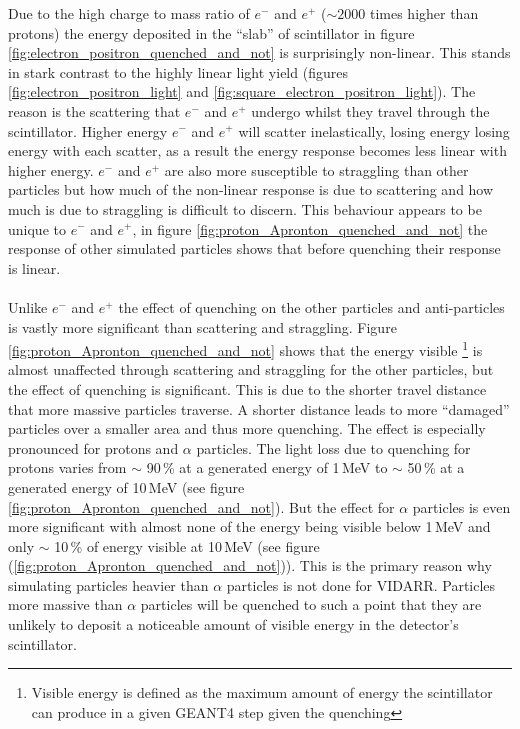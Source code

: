 Due to the high charge to mass ratio of $e^-$ and $e^+$ ($\sim 2000$ times higher than protons) the energy deposited in the ``slab'' of scintillator in figure \ref{fig:electron_positron_quenched_and_not} is surprisingly non-linear. This stands in stark contrast to the highly linear light yield (figures \ref{fig:electron_positron_light} and \ref{fig:square_electron_positron_light}). The reason is the scattering that $e^-$ and $e^+$ undergo whilst they travel through the scintillator. Higher energy $e^-$ and $e^+$ will scatter inelastically, losing energy losing energy with each scatter, as a result the energy response becomes less linear with higher energy. $e^-$ and $e^+$ are also more susceptible to straggling than other particles but how much of the non-linear response is due to scattering and how much is due to straggling is difficult to discern. This behaviour appears to be unique to $e^-$ and $e^+$, in figure \ref{fig:proton_Apronton_quenched_and_not} the response of other simulated particles shows that before quenching their response is linear. 
\\\\Unlike $e^-$ and $e^+$ the effect of quenching on the other particles and anti-particles is vastly more significant than scattering and straggling. Figure \ref{fig:proton_Apronton_quenched_and_not} shows that the energy visible \footnote{Visible energy is defined as the maximum amount of energy the scintillator can produce in a given GEANT4 step given the quenching} is almost unaffected through scattering and straggling for the other particles, but the effect of quenching is significant. This is due to the shorter travel distance that more massive particles traverse. A shorter distance leads to more ``damaged'' particles over a smaller area and thus more quenching. The effect is especially pronounced for protons and $\alpha$ particles. The light loss due to quenching for protons varies from $\sim$ 90\,\% at a generated energy of 1\,MeV to $\sim$ 50\,\% at a generated energy of 10\,MeV (see figure \ref{fig:proton_Apronton_quenched_and_not}). But the effect for $\alpha$ particles is even more significant with almost none of the energy being visible below 1\,MeV and only $\sim$ 10\,\% of energy visible at 10\,MeV (see figure (\ref{fig:proton_Apronton_quenched_and_not})). This is the primary reason why simulating particles heavier than $\alpha$ particles is not done for VIDARR. Particles more massive than $\alpha$ particles will be quenched to such a point that they are unlikely to deposit a noticeable amount of visible energy in the detector's scintillator. 

